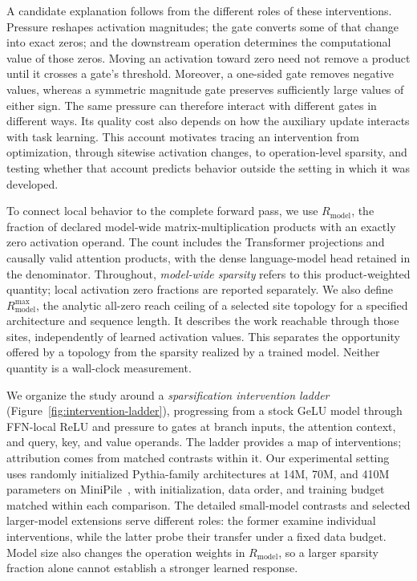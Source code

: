 A candidate explanation follows from the different roles of these interventions.
Pressure reshapes activation magnitudes; the gate converts some of that change
into exact zeros; and the downstream operation determines the computational
value of those zeros. Moving an activation toward zero need not remove a
product until it crosses a gate's threshold. Moreover, a one-sided gate removes
negative values, whereas a symmetric magnitude gate preserves sufficiently
large values of either sign. The same pressure can therefore interact with
different gates in different ways. Its quality cost also depends on how the
auxiliary update interacts with task learning. This account motivates tracing
an intervention from optimization, through sitewise activation changes, to
operation-level sparsity, and testing whether that account predicts behavior
outside the setting in which it was developed.

To connect local behavior to the complete forward pass, we use
$R_{\mathrm{model}}$, the fraction of declared model-wide matrix-multiplication
products with an exactly zero activation operand. The count includes the
Transformer projections and causally valid attention products, with the dense
language-model head retained in the denominator. Throughout, \emph{model-wide
sparsity} refers to this product-weighted quantity; local activation zero
fractions are reported separately. We also define
$R_{\mathrm{model}}^{\max}$, the analytic all-zero reach ceiling of a selected
site topology for a specified architecture and sequence length. It describes
the work reachable through those sites, independently of learned activation
values. This separates the opportunity offered by a topology from the sparsity
realized by a trained model. Neither quantity is a wall-clock measurement.

We organize the study around a \emph{sparsification intervention ladder}
(Figure~\ref{fig:intervention-ladder}), progressing from a stock GeLU model
through FFN-local ReLU and pressure to gates at branch inputs, the attention
context, and query, key, and value operands. The ladder provides a map of
interventions; attribution comes from matched contrasts within it. Our
experimental setting uses randomly initialized Pythia-family architectures
at 14M, 70M, and 410M parameters on MiniPile~\citep{biderman2023pythia,kaddour2023minipile},
with initialization, data order, and training budget matched within each
comparison. The detailed small-model contrasts and selected larger-model
extensions serve different roles: the former examine individual interventions,
while the latter probe their transfer under a fixed data budget. Model size
also changes the operation weights in $R_{\mathrm{model}}$, so a larger sparsity
fraction alone cannot establish a stronger learned response.


